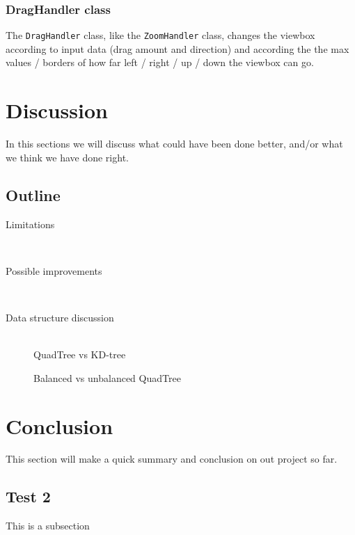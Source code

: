 \documentclass[a4paper,11pt]{article}
\begin{document}
\subsubsection{DragHandler class} %
The \texttt{DragHandler} class, like the \texttt{ZoomHandler} class, changes the viewbox according to input data (drag amount and direction) and according the the max values / borders of how far left / right / up / down the viewbox can go.

\pagebreak
\section{Discussion} %
\label{sec:Discussion}
In this sections we will discuss what could have been done better, and/or what we think we have done right.

\subsection{Outline}
\begin{description}
	\item[Limitations] \hfill \\
	
	\item[Possible improvements] \hfill \\
	
	\item[Data structure discussion] \hfill \\
	QuadTree vs KD-tree
	
	Balanced vs unbalanced QuadTree
\end{description}

\pagebreak
\section{Conclusion} %
\label{sec:Conclusion}
This section will make a quick summary and conclusion on out project so far.

\subsection{Test 2}

This is a subsection
\end{document}
